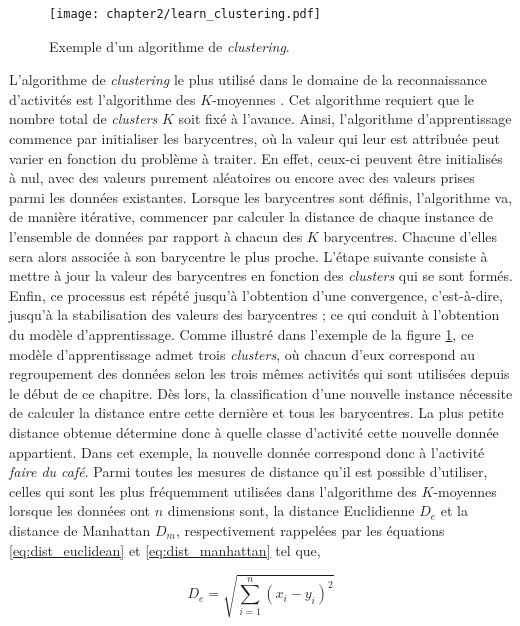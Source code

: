 \begin{figure}[H]
	\centering
	\texttt{[image: chapter2/learn\_clustering.pdf]}
	\caption{Exemple d'un algorithme de \textit{clustering}.}
	\label{fig:learn_clustering}
\end{figure}

L'algorithme de \textit{clustering} le plus utilisé dans le domaine de la reconnaissance d'activités est l'algorithme des $K$-moyennes \citep{Messing2009, Kovashka2010}. Cet algorithme requiert que le nombre total de \textit{clusters} $K$ soit fixé à l'avance. Ainsi, l'algorithme d'apprentissage commence par initialiser les barycentres, où la valeur qui leur est attribuée peut varier en fonction du problème à traiter. En effet, ceux-ci peuvent être initialisés à nul, avec des valeurs purement aléatoires ou encore avec des valeurs prises parmi les données existantes. Lorsque les barycentres sont définis, l'algorithme va, de manière itérative, commencer par calculer la distance de chaque instance de l'ensemble de données par rapport à chacun des $K$ barycentres. Chacune d'elles sera alors associée à son barycentre le plus proche. L'étape suivante consiste à mettre à jour la valeur des barycentres en fonction des \textit{clusters} qui se sont formés. Enfin, ce processus est répété jusqu'à l'obtention d'une convergence, c'est-à-dire, jusqu'à la stabilisation des valeurs des barycentres ; ce qui conduit à l'obtention du modèle d'apprentissage. Comme illustré dans l'exemple de la figure \ref{fig:learn_clustering}, ce modèle d'apprentissage admet trois \textit{clusters}, où chacun d'eux correspond au regroupement des données selon les trois mêmes activités qui sont utilisées depuis le début de ce chapitre. Dès lors, la classification d'une nouvelle instance nécessite de calculer la distance entre cette dernière et tous les barycentres. La plus petite distance obtenue détermine donc à quelle classe d'activité cette nouvelle donnée appartient. Dans cet exemple, la nouvelle donnée correspond donc à l'activité \og \textit{faire du café}\fg. Parmi toutes les mesures de distance qu'il est possible d'utiliser, celles qui sont les plus fréquemment utilisées dans l'algorithme des $K$-moyennes lorsque les données ont $n$ dimensions sont, la distance Euclidienne $D_e$ et la distance de Manhattan $D_m$, respectivement rappelées par les équations \ref{eq:dist_euclidean} et \ref{eq:dist_manhattan} tel que,

\begin{equation}
	\label{eq:dist_euclidean}
	D_e = \sqrt{\sum_{i=1}^{n}(x_i-y_i)^2}
\end{equation}

